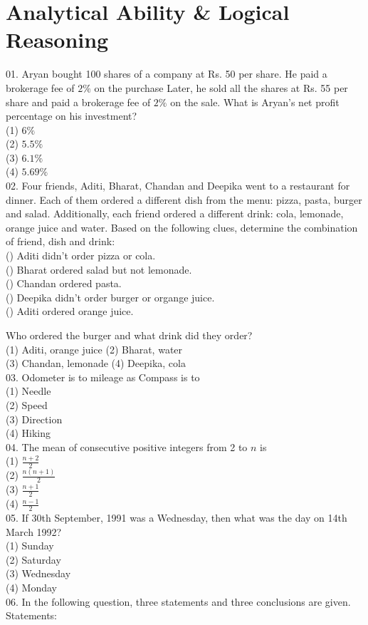\documentclass[10pt]{article}
\begin{document}
\section*{Analytical Ability \& Logical Reasoning}
\begin{enumerate}
  01. Aryan bought 100 shares of a company at Rs. 50 per share. He paid a brokerage fee of $2 \%$ on the purchase Later, he sold all the shares at Rs. 55 per share and paid a brokerage fee of $2 \%$ on the sale. What is Aryan's net profit percentage on his investment?\\
(1) $6 \%$\\
(2) $5.5 \%$\\
(3) $6.1 \%$\\
(4) $5.69 \%$\\
  02. Four friends, Aditi, Bharat, Chandan and Deepika went to a restaurant for dinner. Each of them ordered a different dish from the menu: pizza, pasta, burger and salad. Additionally, each friend ordered a different drink: cola, lemonade, orange juice and water. Based on the following clues, determine the combination of friend, dish and drink:\\
() Aditi didn't order pizza or cola.\\
() Bharat ordered salad but not lemonade.\\
() Chandan ordered pasta.\\
() Deepika didn't order burger or organge juice.\\
() Aditi ordered orange juice.
\end{enumerate}

Who ordered the burger and what drink did they order?\\
(1) Aditi, orange juice (2) Bharat, water\\
(3) Chandan, lemonade (4) Deepika, cola\\
03. Odometer is to mileage as Compass is to\\
(1) Needle\\
(2) Speed\\
(3) Direction\\
(4) Hiking\\
04. The mean of consecutive positive integers from 2 to $n$ is\\
(1) $\frac{n+2}{2}$\\
(2) $\frac{n(n+1)}{2}$\\
(3) $\frac{n+1}{2}$\\
(4) $\frac{n-1}{2}$\\
05. If 30th September, 1991 was a Wednesday, then what was the day on 14th March 1992?\\
(1) Sunday\\
(2) Saturday\\
(3) Wednesday\\
(4) Monday\\
06. In the following question, three statements and three conclusions are given. Statements:
\end{document}
